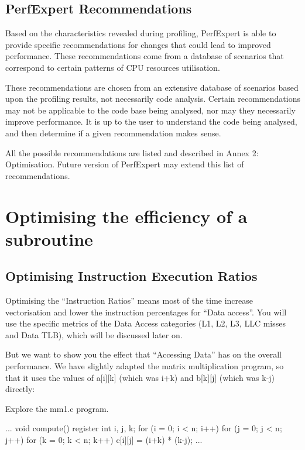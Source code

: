\subsection{PerfExpert Recommendations}
\label{subsec:Recommendations}

Based on the characteristics revealed during profiling, PerfExpert is able to provide specific recommendations for changes that could lead to improved performance. These recommendations come from a database of scenarios that correspond to certain patterns of CPU resources utilisation.

These recommendations are chosen from an extensive database of scenarios based upon the profiling results, not necessarily code analysis. Certain recommendations may not be applicable to the code base being analysed, nor may they necessarily improve performance. It is up to the user to understand the code being analysed, and then determine if a given recommendation makes sense.

All the possible recommendations are listed and described in Annex 2: Optimisation. Future version of PerfExpert may extend this list of recommendations.

\section{Optimising the efficiency of a subroutine}
\label{sec:Optimizing_the_efficiency_of_a_subroutine}

\subsection{Optimising Instruction Execution Ratios}
\label{subsec:Optimizing_Instruction_Execution_Ratios}

Optimising the ``Instruction Ratios'' means most of the time increase vectorisation and lower the instruction percentages for ``Data access''. You will use the specific metrics of the Data Access categories (L1, L2, L3, LLC misses and Data TLB), which will be discussed later on.

But we want to show you the effect that ``Accessing Data'' has on the overall performance. We have slightly adapted the matrix multiplication program, so that it uses the values of a[i][k] (which was i+k) and b[k][j] (which was k-j) directly:

Explore the mm1.c program.

\begin{prompt}
...
void compute()
{
 register int i, j, k;
 for (i = 0; i <{} n; i++)
   for (j = 0; j <{} n; j++)
     for (k = 0; k <{} n; k++)
       c[i][j] = (i+k) * (k-j);
}
...
\end{prompt}

